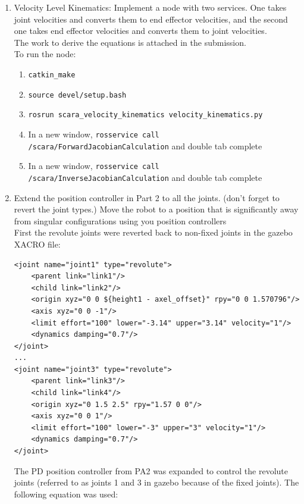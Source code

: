 \documentclass[10pt]{article}
\begin{document}
\begin{enumerate}
	\item Velocity Level Kinematics: Implement a node with two services. One takes joint velocities and converts them to end effector velocities, and the second one takes end effector velocities and converts them to joint velocities.
	\\
	
	The work to derive the equations is attached in the submission.
	\\
	
	To run the node:
	
	\begin{enumerate}
		\item \texttt{catkin\_make}
		\item \texttt{source devel/setup.bash}
		\item \texttt{rosrun scara\_velocity\_kinematics velocity\_kinematics.py}
		\item In a new window, \texttt{rosservice call /scara/ForwardJacobianCalculation} and double tab complete
		\item In a new window, \texttt{rosservice call /scara/InverseJacobianCalculation} and double tab complete
	\end{enumerate}
	
	\item Extend the position controller in Part 2 to all the joints. (don't forget to revert the joint types.) Move the robot to a position that is significantly away from singular configurations using you position controllers
	\\
	
	First the revolute joints were reverted back to non-fixed joints in the gazebo XACRO file:
	
\begin{lstlisting}[style=Matlab-editor,basicstyle=\mlttfamily,escapechar=`]
<joint name="joint1" type="revolute">
	<parent link="link1"/>
	<child link="link2"/>
	<origin xyz="0 0 ${height1 - axel_offset}" rpy="0 0 1.570796"/>
	<axis xyz="0 0 -1"/>
	<limit effort="100" lower="-3.14" upper="3.14" velocity="1"/>
	<dynamics damping="0.7"/>
</joint>
...
<joint name="joint3" type="revolute">
	<parent link="link3"/>
	<child link="link4"/>
	<origin xyz="0 1.5 2.5" rpy="1.57 0 0"/>
	<axis xyz="0 0 1"/>
	<limit effort="100" lower="-3" upper="3" velocity="1"/>
	<dynamics damping="0.7"/>
</joint>
\end{lstlisting} 
	
	The PD position controller from PA2 was expanded to control the revolute joints (referred to as joints 1 and 3 in gazebo because of the fixed joints). The following equation was used:
	

\end{enumerate}
\end{document}
